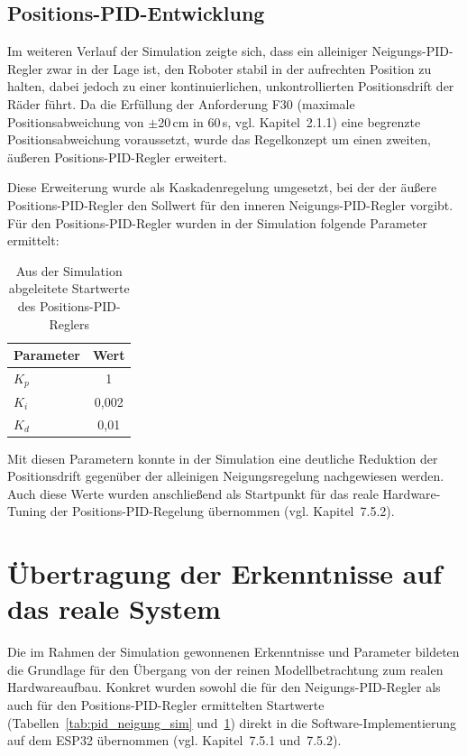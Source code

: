 \documentclass[12pt,ngerman,numbers=noenddot,abstracton,headsepline]{scrreprt}
\begin{document}
\subsection{Positions-PID-Entwicklung}
\label{subsec:simulink_positions_pid}

Im weiteren Verlauf der Simulation zeigte sich, dass ein alleiniger Neigungs-PID-Regler zwar in der Lage ist, den Roboter stabil in der aufrechten Position zu halten, dabei jedoch zu einer kontinuierlichen, unkontrollierten Positionsdrift der Räder führt. Da die Erfüllung der Anforderung F30 (maximale Positionsabweichung von $\pm$20\,cm in 60\,s, vgl. Kapitel~2.1.1) eine begrenzte Positionsabweichung voraussetzt, wurde das Regelkonzept um einen zweiten, äußeren Positions-PID-Regler erweitert.

Diese Erweiterung wurde als Kaskadenregelung umgesetzt, bei der der äußere Positions-PID-Regler den Sollwert für den inneren Neigungs-PID-Regler vorgibt. Für den Positions-PID-Regler wurden in der Simulation folgende Parameter ermittelt:

\begin{table}[h]
    \centering
    \caption{Aus der Simulation abgeleitete Startwerte des Positions-PID-Reglers}
    \label{tab:pid_position_sim}
    \begin{tabular}{|l|c|}
        \hline
        \textbf{Parameter} & \textbf{Wert} \\
        \hline
        $K_p$ & 1 \\
        \hline
        $K_i$ & 0,002 \\
        \hline
        $K_d$ & 0,01 \\
        \hline
    \end{tabular}
\end{table}

Mit diesen Parametern konnte in der Simulation eine deutliche Reduktion der Positionsdrift gegenüber der alleinigen Neigungsregelung nachgewiesen werden. Auch diese Werte wurden anschließend als Startpunkt für das reale Hardware-Tuning der Positions-PID-Regelung übernommen (vgl. Kapitel~7.5.2).

\section{Übertragung der Erkenntnisse auf das reale System}
\label{sec:simulink_transfer}

Die im Rahmen der Simulation gewonnenen Erkenntnisse und Parameter bildeten die Grundlage für den Übergang von der reinen Modellbetrachtung zum realen Hardwareaufbau. Konkret wurden sowohl die für den Neigungs-PID-Regler als auch für den Positions-PID-Regler ermittelten Startwerte (Tabellen~\ref{tab:pid_neigung_sim} und~\ref{tab:pid_position_sim}) direkt in die Software-Implementierung auf dem ESP32 übernommen (vgl. Kapitel~7.5.1 und~7.5.2).
\end{document}
